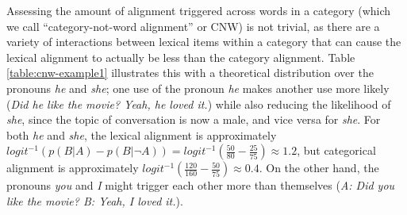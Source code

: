 \documentclass[11pt]{article}
\begin{document}
Assessing the amount of alignment triggered across words in a category (which we call ``category-not-word alignment'' or CNW) is not trivial, as there are a variety of interactions between lexical items within a category that can cause the lexical alignment to actually be less than the category alignment. Table \ref{table:cnw-example1} illustrates this with a theoretical distribution over the pronouns \textit{he} and \textit{she}; one use of the pronoun \textit{he} makes another use more likely (\textit{Did he like the movie? Yeah, he loved it.}) while also reducing the likelihood of \textit{she}, since the topic of conversation is now a male, and vice versa for \textit{she}. For both \textit{he} and \textit{she}, the lexical alignment is approximately $logit^{-1}(p(B|A)-p(B|\neg A)) = logit^{-1}(\frac{50}{80}-\frac{25}{75}) \approx 1.2$,
but categorical alignment is approximately $logit^{-1}(\frac{120}{160}-\frac{50}{75}) \approx 0.4$. On the other hand, the pronouns \textit{you} and \textit{I} might trigger each other more than themselves (\textit{A: Did you like the movie? B: Yeah, I loved it.}).





\end{document}
